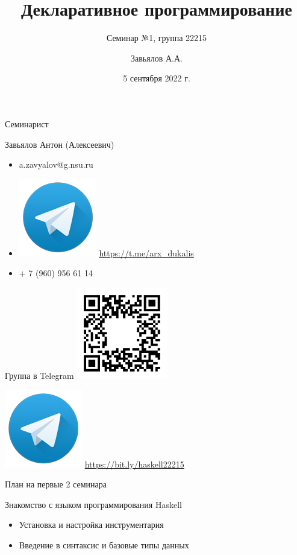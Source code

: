 \documentclass{beamer}
\title{Декларативное программирование}
\subtitle{Семинар №1, группа 22215}
\author{Завьялов А.А.}
\date{5 сентября 2022 г.}
\institute{Кафедра систем информатики ФИТ НГУ}
\begin{document}
  \maketitle
  \addtocounter{framenumber}{1}
  \begin{frame}{Семинарист}
    \begin{block}{Завьялов Антон (Алексеевич)}
        \begin{itemize}
            \item a.zavyalov@g.nsu.ru
            \item \includegraphics[height=\fontcharht\font`\B]{media/telegram128} \url{https://t.me/arx_dukalis}
            \item + 7 (960) 956 61 14
        \end{itemize}
    \end{block}
  \end{frame}
  \begin{frame}{Группа в Telegram}
  \includegraphics[width=4cm]{media/telegram-invite-22215}
  
  \includegraphics[height=\fontcharht\font`\B]{media/telegram128} \url{https://bit.ly/haskell22215}
  \end{frame}
  \begin{frame}{План на первые 2 семинара}
     \begin{block}{Знакомство с языком программирования Haskell}
          \begin{itemize}
              \item Установка и настройка инструментария
              \item Введение в синтаксис и базовые типы данных
          \end{itemize}
      \end{block}
  \end{frame}
\end{document}
